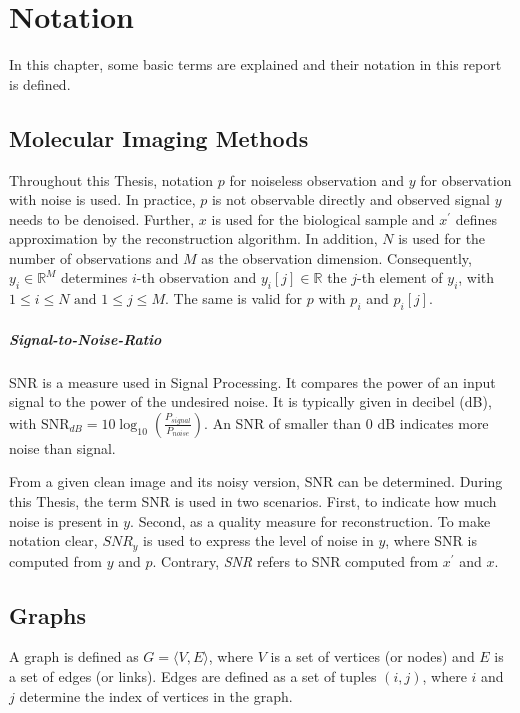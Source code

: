 \chapter{Notation}
\label{sec:notation}

In this chapter, some basic terms are explained and their notation in this report is defined.

\section{Molecular Imaging Methods}
Throughout this Thesis, notation $p$ for noiseless observation and $y$ for observation with noise is used.
In practice, $p$ is not observable directly and observed signal $y$ needs to be denoised.
Further, $x$ is used for the biological sample and $x^{\prime}$ defines approximation by the reconstruction algorithm.
In addition, $N$ is used for the number of observations and $M$ as the observation dimension.
Consequently, $y_i \in \mathbb{R}^M$ determines $i$-th observation and $y_i[j] \in \mathbb{R}$ the $j$-th element of $y_i$,
with $ 1 \leq i \leq N \text{ and } 1 \leq j \leq M$. The same is valid for $p$ with $p_i$ and $p_i[j]$. 


\paragraph{Signal-to-Noise-Ratio}
SNR is a measure used in Signal Processing. 
It compares the power of an input signal to the power of the undesired noise. It is typically given in decibel (dB), with
$\text{SNR}_{dB} = 10 \log_{10} \left(  \frac{P_{signal}}{P_{noise}} \right)$.
An SNR of smaller than 0 dB indicates more noise than signal.

From a given clean image and its noisy version, SNR can be determined.
During this Thesis, the term SNR is used  in two scenarios.
First, to indicate how much noise is present in $y$. Second, as a quality measure for reconstruction.
To make notation clear, $\textit{SNR}_y$ is used to express the level of noise in $y$, 
where SNR is computed from $y$ and $p$.
Contrary, \textit{SNR} refers to SNR computed from $x^{\prime}$ and $x$.

\section{Graphs}
A graph is defined as $G = \langle V,E \rangle$, where $V$ is a set of 
vertices (or nodes) and $E$ is a set of edges (or links). 
Edges are defined as a set of tuples $(i, j)$, where $i$ and $j$ determine 
the index of vertices in the graph.

